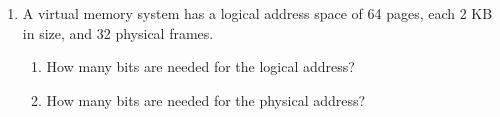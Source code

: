 \documentclass[12pt]{article}
\begin{document}
\begin{enumerate}[label=\textbf{Q\arabic*.}]
    \item A virtual memory system has a logical address space of 64 pages, each 2 KB in size, and 32 physical frames.
    
    \begin{enumerate}
        \item How many bits are needed for the logical address?\\
        \item How many bits are needed for the physical address?\\
    \end{enumerate}

\end{enumerate}
\end{document}
